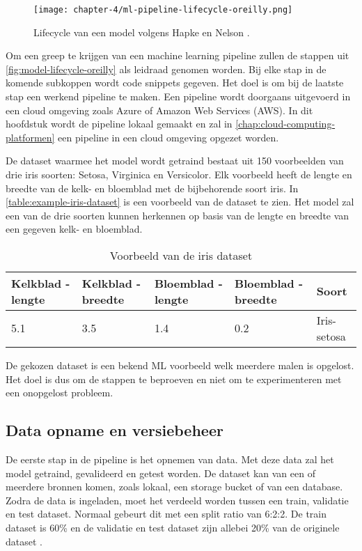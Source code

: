 \begin{figure}[hbt!]
  \centering
  \texttt{[image: chapter-4/ml-pipeline-lifecycle-oreilly.png]}
  \caption{Lifecycle van een model volgens Hapke en Nelson \cite[p.~4]{building-machine-learning-pipelines-oreilly}.}
  \label{fig:model-lifecycle-oreilly}
\end{figure}

Om een greep te krijgen van een machine learning pipeline zullen de stappen uit \autoref{fig:model-lifecycle-oreilly} als leidraad genomen worden. Bij elke stap in de komende subkoppen wordt code snippets gegeven. Het doel is om bij de laatste stap een werkend pipeline te maken. Een pipeline wordt doorgaans uitgevoerd in een cloud omgeving zoals Azure of Amazon Web Services (AWS). In dit hoofdstuk wordt de pipeline lokaal gemaakt en zal in \autoref{chap:cloud-computing-platformen} een pipeline in een cloud omgeving opgezet worden. 

De dataset waarmee het model wordt getraind bestaat uit 150 voorbeelden van drie iris soorten: Setosa, Virginica en Versicolor. Elk voorbeeld heeft de lengte en breedte van de kelk- en bloemblad met de bijbehorende soort iris. In \autoref{table:example-iris-dataset} is een voorbeeld van de dataset te zien. Het model zal een van de drie soorten kunnen herkennen op basis van de lengte en breedte van een gegeven kelk- en bloemblad. 

\begin{table}[hbt!]
  \footnotesize
  \centering
  \begin{tabular}{|l|l|l|l|l|}
  \hline
  \textbf{Kelkblad - lengte} & \textbf{Kelkblad - breedte} & \textbf{Bloemblad - lengte} & \textbf{Bloemblad - breedte} & \textbf{Soort} \\ \hline
  5.1 & 3.5 & 1.4 & 0.2 & Iris-setosa\\ \hline
  \end{tabular}
  \caption{Voorbeeld van de iris dataset}
  \label{table:example-iris-dataset}
\end{table}

De gekozen dataset is een bekend ML voorbeeld welk meerdere malen is opgelost. Het doel is dus om de stappen te beproeven en niet om te experimenteren met een onopgelost probleem.

\subsection{Data opname en versiebeheer}\label{subsec:data-opname-en-versiebeheer}
De eerste stap in de pipeline is het opnemen van data. Met deze data zal het model getraind, gevalideerd en getest worden. De dataset kan van een of meerdere bronnen komen, zoals lokaal, een storage bucket of van een database. Zodra de data is ingeladen, moet het verdeeld worden tussen een train, validatie en test dataset. Normaal gebeurt dit met een split ratio van 6:2:2. De train dataset is 60\% en de validatie en test dataset zijn allebei 20\% van de originele dataset \cite[p.~27-37]{building-machine-learning-pipelines-oreilly}.

